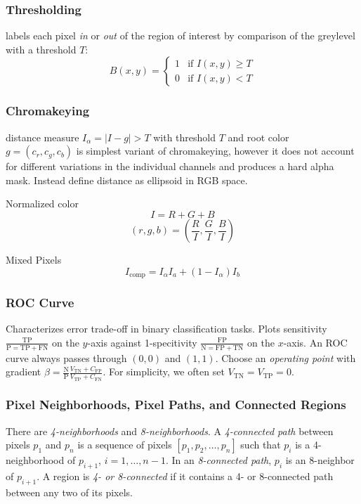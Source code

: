 \documentclass[a4paper,10pt]{article}
\begin{document}
\subsubsection{Thresholding}
labels each pixel \emph{in} or \emph{out} of the region of interest by comparison of the greylevel with a threshold \(T\):
\[B(x, y) = \begin{cases} 1 & \text{if } I(x, y) \geq T\\ 0 & \text{if } I(x, y) < T\end{cases}\]

\subsubsection{Chromakeying}
 distance measure \(I_\alpha = |I - g| > T\) with threshold \(T\) and root color \(g = (c_r, c_g, c_b)\) is simplest variant of chromakeying, however it does not account for different variations in the individual channels and produces a hard alpha mask. Instead define distance as ellipsoid in RGB space.
\begin{subbox}{Normalized color}
    \[I = R + G + B\]
    \[(r, g, b) = \left(\frac{R}{I}, \frac{G}{I}, \frac{B}{I}\right)\]
\end{subbox}
\begin{subbox}{Mixed Pixels}
    \[I_\text{comp} = I_\alpha I_a + (1 - I_\alpha) I_b\]
\end{subbox}

\subsubsection{ROC Curve}
Characterizes error trade-off in binary classification tasks. Plots sensitivity \(\frac{\text{TP}}{\text{P} = \text{TP} + \text{FN}}\) on the \(y\)-axis against 1-specitivity \(\frac{\text{FP}}{\text{N} = \text{FP} + \text{TN}}\) on the \(x\)-axis. An ROC curve always passes through \((0, 0)\) and \((1, 1)\). Choose an \emph{operating point} with gradient \(\beta = \frac{\text{N}}{\text{P}} \frac{V_\text{TN} + C_\text{FP}}{V_\text{TP} + C_\text{FN}}\). For simplicity, we often set \(V_\text{TN} = V_\text{TP} = 0\).

\subsubsection{Pixel Neighborhoods, Pixel Paths, and Connected Regions} There are \emph{4-neighborhoods} and \emph{8-neighborhoods}. A \emph{4-connected path} between pixels \(p_1\) and \(p_n\) is a sequence of pixels \([p_1, p_2, \dots, p_n]\) such that \(p_i\) is a 4-neighborhood of \(p_{i + 1}\), \(i = 1, \dots, n - 1\). In an \emph{8-connected path}, \(p_i\) is an 8-neighbor of \(p_{i + 1}\). A region is \emph{4- or 8-connected} if it contains a 4- or 8-connected path between any two of its pixels.
\end{document}
